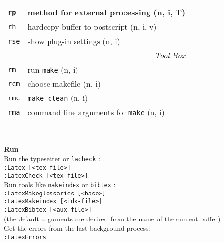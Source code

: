 \documentclass[oneside,10pt,landscape,DIV16]{scrartcl}
\newcommand{\Map}[1] {\textbf{\textasciiacute}\texttt{#1}}
\begin{document}
\begin{multicols}{3}
\begin{center}
\begin{tabular}[]{|p{11mm}|p{62mm}|}
\hline \Map{rp}   & method for external processing           \hfill (n, i, T)\\
\hline
\hline \Map{rh}   & hardcopy buffer to postscript            \hfill (n, i, v)\\
\hline \Map{rse}  & show plug-in settings                    \hfill (n, i)\\
\hline
\hline
\multicolumn{2}{|r|}{\textsl{Tool Box}} \\[1.0ex]
\hline \Map{rm}  & run \texttt{make}                        \hfill (n, i)   \\
\hline \Map{rcm} & choose makefile                          \hfill (n, i)   \\
\hline \Map{rmc} & \texttt{make clean}                      \hfill (n, i)   \\
\hline \Map{rma} & command line arguments for \texttt{make} \hfill (n, i)   \\
\hline
\end{tabular}\\[2.5ex]
%
\parbox[t][80mm][t]{70mm}{%
%
\large{\textbf{Run}}\\[1.0ex]
Run the typesetter or \texttt{lacheck} : \\[1.0ex]
\texttt{:Latex [<tex-file>]} \\[1.0ex]
\texttt{:LatexCheck [<tex-file>]} \\[1.0ex]
Run tools like \texttt{makeindex} or \texttt{bibtex} : \\[1.0ex]
\texttt{:LatexMakeglossaries [<base>]} \\[1.0ex]
\texttt{:LatexMakeindex [<idx-file>]} \\[1.0ex]
\texttt{:LatexBibtex [<aux-file>]} \\[1.0ex]
(the default arguments are derived from the name of the current buffer) \\[2.5ex]
Get the errors from the last background process: \\[1.0ex]
\texttt{:LatexErrors} \\[2.5ex]
}
%

\end{center}
\end{multicols}
\end{document}
